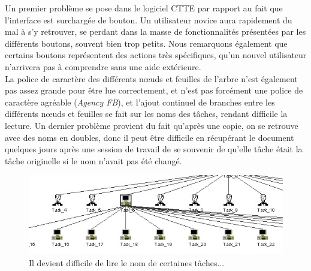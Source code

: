 \documentclass[12pt, a4paper]{article}
\begin{document}
Un premier problème se pose dans le logiciel CTTE par rapport au fait que l'interface est surchargée de bouton. Un utilisateur novice aura rapidement du mal à s'y retrouver, se perdant dans la masse de fonctionnalités présentées par les différents boutons, souvent bien trop petits. Nous remarquons également que certains boutons représentent des actions très spécifiques, qu'un nouvel utilisateur n'arrivera pas à comprendre sans une aide extérieure.\\ 
La police de caractère des différents nœuds et feuilles de l'arbre n'est également pas assez grande pour être lue correctement, et n'est pas forcément une police de caractère agréable (\emph{Agency FB}), et l'ajout continuel de branches entre les différents nœuds et feuilles se fait sur les noms des tâches, rendant difficile la lecture. Un dernier problème provient du fait qu'après une copie, on se retrouve avec des noms en doubles, donc il peut être difficile en récupérant le document quelques jours après une session de travail de se souvenir de qu'elle tâche était la tâche originelle si le nom n'avait pas été changé. 
\begin{figure}[h]
\begin{center}
   \includegraphics[scale = 0.7]{empilement.jpg}
	\caption{Il devient difficile de lire le nom de certaines tâches...}
	\end{center}
\end{figure}
\end{document}
